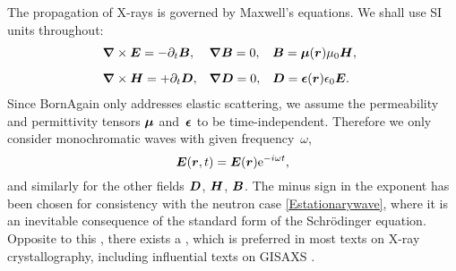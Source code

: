 %
%

The propagation of X-rays is governed by Maxwell's equations.
We shall use SI units throughout:
%
\begin{equation}\label{EMaxwell}
  \begin{array}{@{}l@{\quad}l@{\quad}l}
    \Nabla\times\v{E}=-\partial_t \v{B},
   &\Nabla\v{B}=0,
   &\v{B}=\v{\mu}(\r)\mu_0\v{H},
   \\[2ex]
    \Nabla\times\v{H}=+\partial_t \v{D},
   &\Nabla\v{D}=0,
   &\v{D}=\v{\eps}(\r)\eps_0\v{E}.
  \end{array}
\end{equation}
%
%
%
%
%
%
%
%
%
Since BornAgain only addresses elastic scattering,
%
%
we assume the permeability and permittivity tensors $\bm{\mu}$ and~$\bm{\epsilon}$
to be time-independent.
%
Therefore we only consider monochromatic waves
%
%
with given frequency~$\omega$,
\begin{equation}\label{EstationaryX}
  \v{E}(\r,t) = \v{E}(\r)\e^{-i\omega t},
\end{equation}
and similarly for the other fields $\bm{D}$, $\bm{H}$, $\bm{B}$.
The minus sign in the exponent has been chosen
for consistency with the neutron case \cref{Estationarywave},
where it is an inevitable consequence
of the standard form of the Schrödinger equation.
%
Opposite to this ,
there exists a ,
which is preferred in most texts on X-ray crystallography,
including influential texts on GISAXS \cite{ReLL09}.

